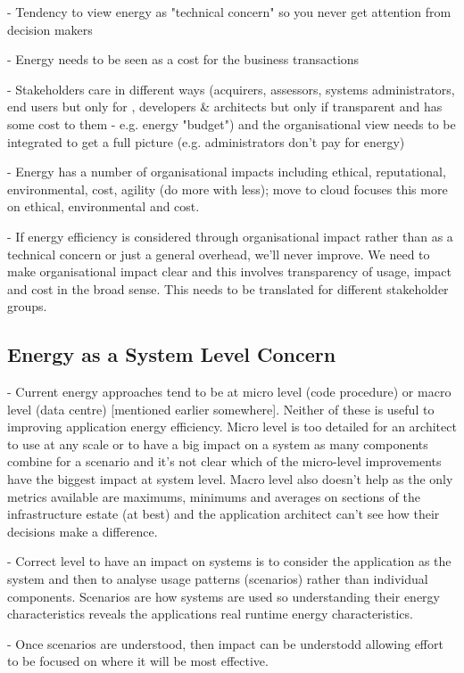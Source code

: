 - Tendency to view energy as "technical concern" so you never get attention from decision makers

- Energy needs to be seen as a cost for the business transactions

- Stakeholders care in different ways (acquirers, assessors, systems administrators, end users but only for , developers \& architects but only if transparent and has some cost to them - e.g. energy "budget") and the organisational view needs to be integrated to get a full picture (e.g. administrators don't pay for energy)

- Energy has a number of organisational impacts including ethical, reputational, environmental, cost, agility (do more with less); move to cloud focuses this more on ethical, environmental and cost.

- If energy efficiency is considered through organisational impact rather than as a technical concern or just a general overhead, we'll never improve.  We need to make organisational impact clear and this involves transparency of usage, impact and cost in the broad sense.  This needs to be translated for different stakeholder groups. 

\subsection{Energy as a System Level Concern}

- Current energy approaches tend to be at micro level (code procedure) or macro level (data centre) [mentioned earlier somewhere].  Neither of these is useful to improving application energy efficiency.  Micro level is too detailed for an architect to use at any scale or to have a big impact on a system as many components combine for a scenario and it's not clear which of the micro-level improvements have the biggest impact at system level.  Macro level also doesn't help as the only metrics available are maximums, minimums and averages on sections of the infrastructure estate (at best) and the application architect can't see how their decisions make a difference.

- Correct level to have an impact on systems is to consider the application as the system and then to analyse usage patterns (scenarios) rather than individual components.  Scenarios are how systems are used so understanding their energy characteristics reveals the applications real runtime energy characteristics.

- Once scenarios are understood, then impact can be understodd allowing effort to be focused on where it will be most effective.

